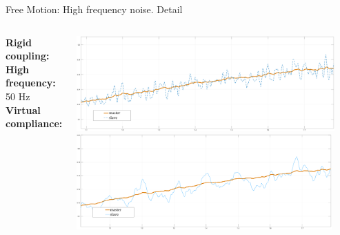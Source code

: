 \documentclass[10pt]{beamer}
\begin{document}
\begin{frame}{Free Motion: High frequency noise. Detail}
  \smallskip
  \begin{columns}
    \color{Orange}\textbf{Rigid coupling:}\\
    \bigskip
    \bigskip
    \bigskip
    \color{black}\textbf{High frequency:} 50 Hz\\
    \bigskip
    \bigskip
    \bigskip
    \color{LightBlue}\textbf{Virtual compliance:}\\

 
   \includegraphics[width=\textwidth,
    height=0.45\textwidth]{../reportTeleop/Images/rCoupFree50htznoise}\\
    \smallskip
    \includegraphics[width=\textwidth,
    height=0.45\textwidth]{../reportTeleop/Images/set20freePart50Htznoise}
    \end{columns}
  

\end{frame}
\end{document}
